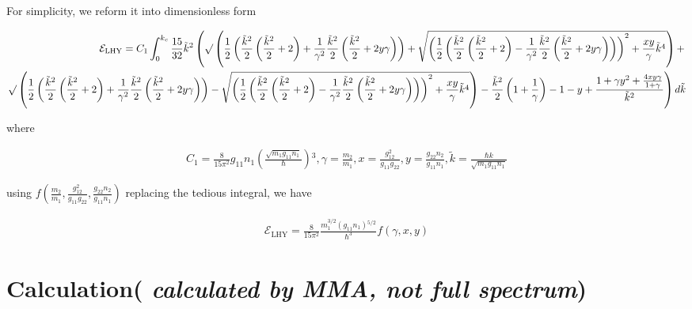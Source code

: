 For simplicity, we reform it into dimensionless form

\begin{equation}
\begin{split}
\mathcal{E}_{\text{LHY}}=C_1\int _0^{k_c}\frac{15}{32}\tilde{k}^2\left(\surd \left(\frac{1}{2}\left( \frac{\tilde{k}^2}{2}\left(\frac{\tilde{k}^2}{2}+2\right)+\frac{1}{\gamma
^2}\frac{\tilde{k}^2}{2}\left(\frac{\tilde{k}^2}{2}+2y \gamma \right)\right)+\sqrt{\left(\frac{1}{2}\left( \frac{\tilde{k}^2}{2}\left(\frac{\tilde{k}^2}{2}+2\right)-\frac{1}{\gamma
^2}\frac{\tilde{k}^2}{2}\left(\frac{\tilde{k}^2}{2}+2y \gamma \right)\right)\right)^2+\frac{x y}{\gamma }\tilde{k}^4}\right)+\right.\\
\left.\surd \left(\frac{1}{2}\left( \frac{\tilde{k}^2}{2}\left(\frac{\tilde{k}^2}{2}+2\right)+\frac{1}{\gamma ^2}\frac{\tilde{k}^2}{2}\left(\frac{\tilde{k}^2}{2}+2y
\gamma \right)\right)-\sqrt{\left(\frac{1}{2}\left( \frac{\tilde{k}^2}{2}\left(\frac{\tilde{k}^2}{2}+2\right)-\frac{1}{\gamma ^2}\frac{\tilde{k}^2}{2}\left(\frac{\tilde{k}^2}{2}+2y
\gamma \right)\right)\right)^2+\frac{x y}{\gamma }\tilde{k}^4}\right)-\frac{\tilde{k}^2}{2}\left(1+\frac{1}{\gamma }\right)-1-y+\frac{1+\gamma  y^2+\frac{4x
y \gamma }{1+\gamma }}{\tilde{k}^2}\right)d\tilde{k}
\end{split}
\end{equation}

where

\begin{equation}
\begin{split}
C_1=\frac{8}{15\pi ^2}g_{11}n_1\left(\frac{\sqrt{m_1g_{11}n_1}}{\hbar }\right){}^3, \gamma =\frac{m_2}{m_1}, x=\frac{g_{12}^2}{g_{11}g_{22}}, y=\frac{g_{22}n_2}{g_{11}n_1},
\tilde{k}=\frac{\hbar  k}{\sqrt{m_1g_{11}n_1}}
\end{split}
\end{equation}

using \(f\left(\frac{m_2}{m_1},\frac{g_{12}^2}{g_{11}g_{22}},\frac{g_{22}n_2}{g_{11}n_1}\right)\) replacing the tedious integral, we have

\begin{equation}
\begin{split}
\mathcal{E}_{\text{LHY}}=\frac{8}{15\pi ^2}\frac{m_1^{3/2}\left(g_{11}n_1\right){}^{5/2}}{\hbar ^3}f(\gamma ,x,y)
\end{split}
\end{equation}

\section{Calculation(\textit{ calculated by MMA, not full spectrum})}

